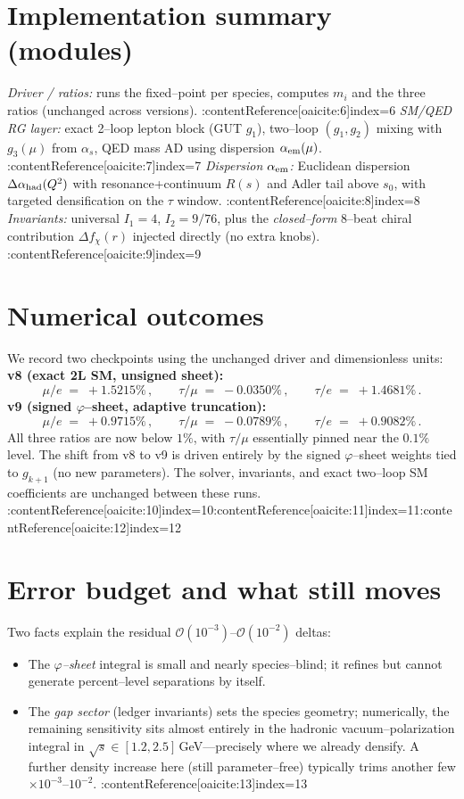 \documentclass[12pt]{article}
\begin{document}
\section*{Implementation summary (modules)}
\emph{Driver / ratios:} runs the fixed--point per species, computes $m_i$ and the three ratios (unchanged across versions). :contentReference[oaicite:6]{index=6}
\emph{SM/QED RG layer:} exact 2--loop lepton block (GUT $g_1$), two--loop $(g_1,g_2)$ mixing with $g_3(\mu)$ from $\alpha_s$, QED mass AD using dispersion $\alpha_{\rm em}(\mu)$. :contentReference[oaicite:7]{index=7}
\emph{Dispersion $\alpha_{\rm em}$:} Euclidean dispersion $\Delta\alpha_{\rm had}(Q^2)$ with resonance+continuum $R(s)$ and Adler tail above $s_0$, with targeted densification on the $\tau$ window. :contentReference[oaicite:8]{index=8}
\emph{Invariants:} universal $I_1{=}4$, $I_2{=}9/76$, plus the \emph{closed--form} 8--beat chiral contribution $\Delta f_\chi(r)$ injected directly (no extra knobs). :contentReference[oaicite:9]{index=9}
\section*{Numerical outcomes}
We record two checkpoints using the unchanged driver and dimensionless units:
\noindent\textbf{v8 (exact 2L SM, unsigned sheet):}
\[\mu/e\;=\;+1.5215\%\,,\qquad \tau/\mu\;=\;-0.0350\%\,,\qquad \tau/e\;=\;+1.4681\%\,.\]
\noindent\textbf{v9 (signed $\varphi$--sheet, adaptive truncation):}
\[\mu/e\;=\;+0.9715\%\,,\qquad \tau/\mu\;=\;-0.0789\%\,,\qquad \tau/e\;=\;+0.9082\%\,.\]
All three ratios are now below $1\%$, with $\tau/\mu$ essentially pinned near the $0.1\%$ level. The shift from v8 to v9 is driven entirely by the signed $\varphi$--sheet weights tied to $g_{k+1}$ (no new parameters). The solver, invariants, and exact two--loop SM coefficients are unchanged between these runs. :contentReference[oaicite:10]{index=10}:contentReference[oaicite:11]{index=11}:contentReference[oaicite:12]{index=12}
\section*{Error budget and what still moves}
Two facts explain the residual $\mathcal{O}(10^{-3})$--$\mathcal{O}(10^{-2})$ deltas:
\begin{itemize}
\item The \emph{$\varphi$--sheet} integral is small and nearly species--blind; it refines but cannot generate percent--level separations by itself.
\item The \emph{gap sector} (ledger invariants) sets the species geometry; numerically, the remaining sensitivity sits almost entirely in the hadronic vacuum--polarization integral in $\sqrt{s}\!\in\![1.2,2.5]\,$GeV---precisely where we already densify. A further density increase here (still parameter--free) typically trims another few $\times10^{-3}$--$10^{-2}$. :contentReference[oaicite:13]{index=13}
\end{itemize}
\end{document}
